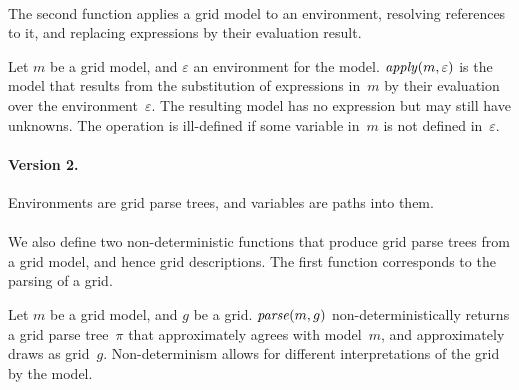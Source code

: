 \documentclass[a4paper]{llncs}
\begin{document}
\paragraph{}
The second function applies a grid model to an
environment, resolving references to it, and replacing expressions by
their evaluation result.

\begin{definition}
  Let $m$ be a grid model, and $\varepsilon$ an environment for the
  model. ${\it apply}(m,\varepsilon)$ is the model that results from
  the substitution of expressions in~$m$ by their evaluation over the
  environment~$\varepsilon$. The resulting model has no expression but
  may still have unknowns.
  The operation is ill-defined if some variable in~$m$ is not defined
  in~$\varepsilon$. 
\end{definition}

\paragraph{Version 2.} Environments are grid parse trees, and
variables are paths into them.

\paragraph{}
We also define two non-deterministic functions that produce grid parse
trees from a grid model, and hence grid descriptions. The first
function corresponds to the parsing of a grid.

\begin{definition}
  Let $m$ be a grid model, and $g$ be a grid. ${\it parse}(m,g)$
  non-deterministically returns a grid parse tree~$\pi$ that
  approximately agrees with model~$m$, and approximately draws as
  grid~$g$. Non-determinism allows for different interpretations of
  the grid by the model.
\end{definition}
\end{document}
